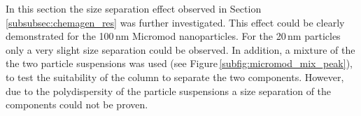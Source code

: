 In this section the size separation effect observed in Section\,\ref{subsubsec:chemagen_res} was further investigated. This effect could be clearly demonstrated for the 100\,nm Micromod nanoparticles. For the 20\,nm particles only a very slight size separation could be observed. In addition, a mixture of the the two particle suspensions was used (see Figure\,\ref{subfig:micromod_mix_peak}), to test the suitability of the column to separate the two components. However, due to the polydispersity of the particle suspensions a size separation of the components could not be proven.   